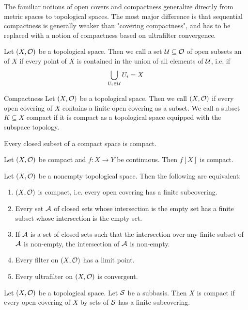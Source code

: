 The familiar notions of open covers and compactness generalize directly from metric spaces to topological spaces. The most major difference is that sequential compactness is generally weaker than "covering compactness", and has to be replaced with a notion of compactness based on ultrafilter convergence.
\begin{definition}
	Let $(X, \mathcal{O})$ be a topological space. Then we call a set $\mathcal{U} \subseteq \mathcal{O}$ of open subsets an  of $X$ if every point of $X$ is contained in the union of all elements of $\mathcal{U}$, i.e. if
	\begin{align*}
		\bigcup_{U_i \in \mathcal{U}} U_i = X
	\end{align*}
\end{definition}
\begin{importantdefinition}{Compactness}{}
	Let $(X, \mathcal{O})$ be a topological space. Then we call $(X, \mathcal{O})$  if every open covering of $X$ contains a finite open covering as a subset. We call a subset $K \subseteq X$ compact if it is compact as a topological space equipped with the subspace topology.
\end{importantdefinition}
\begin{exercise}
	Every closed subset of a compact space is compact.
\end{exercise}
\begin{exercise}
	Let $(X, \mathcal{O})$ be compact and $f : X \to Y$ be continuous. Then $f[X]$ is compact.
\end{exercise}
\begin{exercise}
	Let $(X, \mathcal{O})$ be a nonempty topological space. Then the following are equivalent:
	\begin{enumerate}
		\item $(X,\mathcal{O})$ is compact, i.e. every open covering has a finite subcovering.
		\item Every set $\mathcal{A}$ of closed sets whose intersection is the empty set has a finite subset whose intersection is the empty set.
		\item If $\mathcal{A}$ is a set of closed sets such that the intersection over any finite subset of $\mathcal{A}$ is non-empty, the intersection of $\mathcal{A}$ is non-empty.
		\item Every filter on $(X, \mathcal{O})$ has a limit point.
		\item Every ultrafilter on $(X, \mathcal{O})$ is convergent.
	\end{enumerate}
\end{exercise}
\begin{theorem}
	Let $(X, \mathcal{O})$ be a topological space. Let $\mathcal{S}$ be a subbasis. Then $X$ is compact if every open covering of $X$ by sets of $\mathcal{S}$ has a finite subcovering.
\end{theorem}
